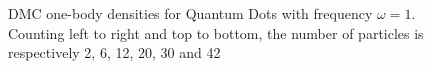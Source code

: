 \begin{figure}
\begin{center}
  \caption{DMC one-body densities for Quantum Dots with frequency $\omega=1$. Counting left to right and top to bottom, the number of particles is respectively 2, 6, 12, 20, 30 and 42}
  \label{fig:OBD_DMC_QDOTS_w1}
 \end{center}
\end{figure}


\begin{figure}
 \begin{center}
   \\

\end{center}
\end{figure}
